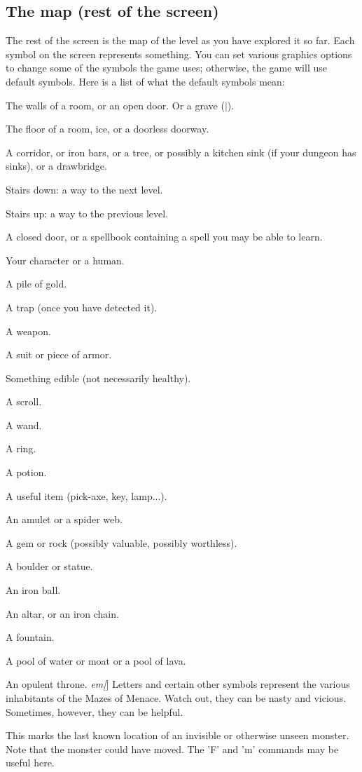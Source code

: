 \subsection*{The map (rest of the screen)}

The rest of the screen is the map of the level as you have explored it
so far.  Each symbol on the screen represents something.  You can set
various graphics options to change some of the symbols the game uses;
otherwise, the game will use default symbols.  Here is a list of what the
default symbols mean:
\blist{}
\item[\tb{- and |}]
The walls of a room, or an open door.  Or a grave ($|$).
\item[\tb{.}]
The floor of a room, ice, or a doorless doorway.
\item[\tb{\#}]
A corridor, or iron bars, or a tree, or possibly a kitchen sink (if
your dungeon has sinks), or a drawbridge.
\item[\tb{>}]
Stairs down: a way to the next level.
\item[\tb{<}]
Stairs up: a way to the previous level.
\item[\tb{+}]
A closed door, or a spellbook containing a spell you may be able to learn.
\item[\tb{@}]
Your character or a human.
\item[\tb{\$}]
A pile of gold.
\item[\tb{\^}]
A trap (once you have detected it).
\item[\tb{)}]
A weapon.
\item[\tb{[}]
A suit or piece of armor.
\item[\tb{\%}]
Something edible (not necessarily healthy).
\item[\tb{?}]
A scroll.
\item[\tb{/}]
A wand.
\item[\tb{=}]
A ring.
\item[\tb{!}]
A potion.
\item[\tb{(}]
A useful item (pick-axe, key, lamp...).
\item[\tb{"""}]
An amulet or a spider web.
\item[\tb{*}]
A gem or rock (possibly valuable, possibly worthless).
\item[\tb{`}]
A boulder or statue.
\item[\tb{0}]
An iron ball.
\item[\tb{_}]
An altar, or an iron chain.
\item[\tb{\{}]
A fountain.
\item[\tb{\}}]
A pool of water or moat or a pool of lava.
\item[\tb{\/}]
An opulent throne.
{\it em[}]
Letters and certain other symbols represent the various inhabitants
of the Mazes of Menace.  Watch out, they can be nasty and vicious.
Sometimes, however, they can be helpful.
\item[\tb{I}]
This marks the last known location of an invisible or otherwise unseen
monster.  Note that the monster could have moved.  The 'F' and 'm' commands
may be useful here.
\elist

